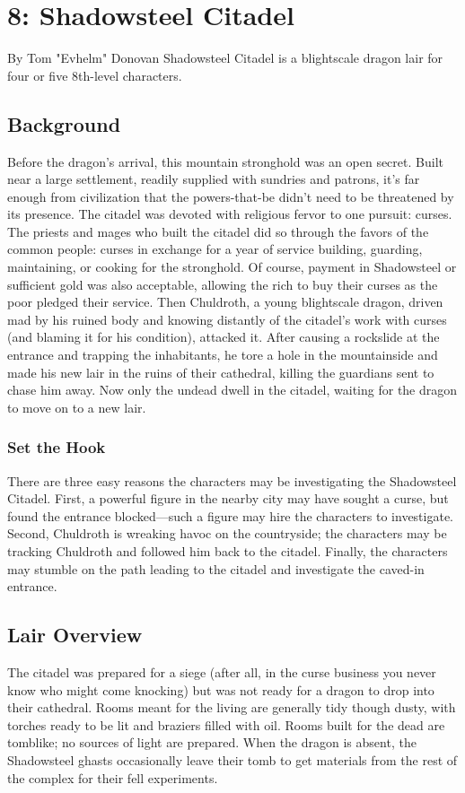 \documentclass[10pt,a4paper,twoside,twocolumn,openany,bg=print,nodeprecatedcode]{dndbook}
\begin{document}
\chapter{8: Shadowsteel Citadel}
By Tom "Evhelm" Donovan
Shadowsteel Citadel is a blightscale dragon lair for four or five 8th-level characters.
\section{Background}
Before the dragon's arrival, this mountain stronghold was an open secret. Built near a large settlement, readily supplied with sundries and patrons, it's far enough from civilization that the powers-that-be didn't need to be threatened by its presence. The citadel was devoted with religious fervor to one pursuit: curses. The priests and mages who built the citadel did so through the favors of the common people: curses in exchange for a year of service building, guarding, maintaining, or cooking for the stronghold. Of course, payment in Shadowsteel or sufficient gold was also acceptable, allowing the rich to buy their curses as the poor pledged their service.
Then Chuldroth, a young blightscale dragon, driven mad by his ruined body and knowing distantly of the citadel's work with curses (and blaming it for his condition), attacked it. After causing a rockslide at the entrance and trapping the inhabitants, he tore a hole in the mountainside and made his new lair in the ruins of their cathedral, killing the guardians sent to chase him away. Now only the undead dwell in the citadel, waiting for the dragon to move on to a new lair.
\subsection{Set the Hook}
There are three easy reasons the characters may be investigating the Shadowsteel Citadel. First, a powerful figure in the nearby city may have sought a curse, but found the entrance blocked—such a figure may hire the characters to investigate. Second, Chuldroth is wreaking havoc on the countryside; the characters may be tracking Chuldroth and followed him back to the citadel. Finally, the characters may stumble on the path leading to the citadel and investigate the caved-in entrance.
\section{Lair Overview}
The citadel was prepared for a siege (after all, in the curse business you never know who might come knocking) but was not ready for a dragon to drop into their cathedral. Rooms meant for the living are generally tidy though dusty, with torches ready to be lit and braziers filled with oil. Rooms built for the dead are tomblike; no sources of light are prepared. When the dragon is absent, the Shadowsteel ghasts occasionally leave their tomb to get materials from the rest of the complex for their fell experiments.
\end{document}
